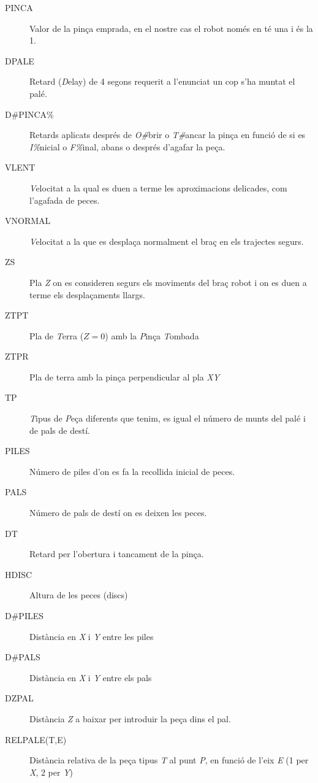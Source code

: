 \begin{description}\label{macprop}
\item [PINCA] Valor de la pinça emprada, en el nostre cas el robot només en té
una i és la 1.

\item [DPALE] Retard (\emph{D}elay) de 4 segons requerit a l'enunciat un cop
s'ha muntat el palé.

\item [D\#PINCA\%] Retards aplicats després de \emph{O\#}brir o
\emph{T\#}ancar la pinça en funció de si es \emph{I\%}nicial o \emph{F\%}inal,
abans o després d'agafar la peça.

\item [VLENT] \emph{V}elocitat a la qual es duen a terme les aproximacions
delicades, com l'agafada de peces.

\item [VNORMAL] \emph{V}elocitat a la que es desplaça normalment el braç en els
trajectes segurs.

\item [ZS] Pla \emph{Z} on es consideren segurs els moviments del braç robot i on
es duen a terme els desplaçaments llargs.

\item [ZTPT] Pla de \emph{T}erra ($Z = 0$) amb la \emph{P}inça \emph{T}ombada

\item [ZTPR] Pla de terra amb la pinça perpendicular al pla \emph{XY}  
                                                                                                         
\item [TP] \emph{T}ipus de \emph{P}eça diferents que tenim, es igual el
número de munts del palé i de pals de destí.

\item [PILES] Número de piles d'on es fa la recollida inicial de peces.

\item [PALS] Número de pals de destí on es deixen les peces.

\item [DT] Retard per l'obertura i tancament de la pinça.

\item [HDISC] Altura de les peces (discs)

\item [D\#PILES] Distància en \emph{X} i \emph{Y} entre les piles

\item [D\#PALS] Distància en \emph{X} i \emph{Y} entre els pals

\item [DZPAL] Distància \emph{Z} a baixar per introduir la peça dins el pal.

\item [RELPALE(T,E)] Distància relativa de la peça tipus \emph{T} al punt
\emph{P}, en funció de l'eix \emph{E} (1 per \emph{X}, 2 per \emph{Y})
\end{description}


